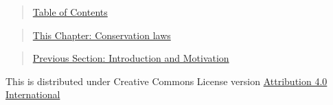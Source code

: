 
\begin{quote}
\href{https://www.authorea.com/users/24891/articles/131414/_show_article}{Table of Contents}
\end{quote}

\begin{quote}
\href{https://www.authorea.com/users/24891/articles/131413/_show_article}{This Chapter: Conservation laws}
\end{quote}

\begin{quote}
\href{https://www.authorea.com/users/24891/articles/131413/_show_article}{Previous Section: Introduction and Motivation}
\end{quote}

This is distributed under Creative Commons License version \href{http://creativecommons.org/licenses/by/4.0/}{Attribution 4.0 International}
